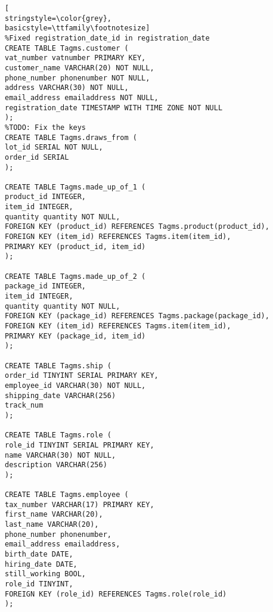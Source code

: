 \begin{lstlisting}[
stringstyle=\color{grey},
basicstyle=\ttfamily\footnotesize]
%Fixed registration_date_id in registration_date
CREATE TABLE Tagms.customer (
vat_number vatnumber PRIMARY KEY,
customer_name VARCHAR(20) NOT NULL,
phone_number phonenumber NOT NULL,
address VARCHAR(30) NOT NULL,
email_address emailaddress NOT NULL,
registration_date TIMESTAMP WITH TIME ZONE NOT NULL
);
%TODO: Fix the keys
CREATE TABLE Tagms.draws_from (
lot_id SERIAL NOT NULL,
order_id SERIAL
);

CREATE TABLE Tagms.made_up_of_1 (
product_id INTEGER,
item_id INTEGER,
quantity quantity NOT NULL,
FOREIGN KEY (product_id) REFERENCES Tagms.product(product_id),
FOREIGN KEY (item_id) REFERENCES Tagms.item(item_id),
PRIMARY KEY (product_id, item_id)
);

CREATE TABLE Tagms.made_up_of_2 (
package_id INTEGER,
item_id INTEGER,
quantity quantity NOT NULL,
FOREIGN KEY (package_id) REFERENCES Tagms.package(package_id),
FOREIGN KEY (item_id) REFERENCES Tagms.item(item_id),
PRIMARY KEY (package_id, item_id)
);

CREATE TABLE Tagms.ship (
order_id TINYINT SERIAL PRIMARY KEY,
employee_id VARCHAR(30) NOT NULL,
shipping_date VARCHAR(256)
track_num
);

CREATE TABLE Tagms.role (
role_id TINYINT SERIAL PRIMARY KEY,
name VARCHAR(30) NOT NULL,
description VARCHAR(256)
);

CREATE TABLE Tagms.employee (
tax_number VARCHAR(17) PRIMARY KEY,
first_name VARCHAR(20),
last_name VARCHAR(20),
phone_number phonenumber,
email_address emailaddress,
birth_date DATE,
hiring_date DATE,
still_working BOOL,
role_id TINYINT,
FOREIGN KEY (role_id) REFERENCES Tagms.role(role_id)
);


\end{lstlisting}